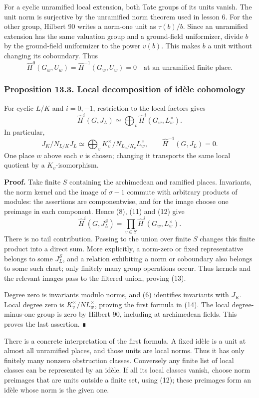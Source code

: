 \documentclass[11pt,a4paper]{article}
\begin{document}
For a cyclic unramified local extension, both Tate groups of its units
vanish. The unit norm is surjective by the unramified norm theorem used
in lesson 6. For the other group, Hilbert 90 writes a norm-one unit as
\(\tau(b)/b\). Since an unramified extension has the same valuation
group and a ground-field uniformizer, divide \(b\) by the ground-field
uniformizer to the power \(v(b)\). This makes \(b\) a unit without
changing its coboundary. Thus \[
\widehat H^0(G_w,U_w)=\widehat H^{-1}(G_w,U_w)=0
\quad\text{at an unramified finite place.}
\tag{12}
\]

\subsubsection{Proposition 13.3. Local decomposition of idèle
cohomology}\label{proposition-13.3.-local-decomposition-of-iduxe8le-cohomology}

For cyclic \(L/K\) and \(i=0,-1\), restriction to the local factors
gives \[
\widehat H^i(G,J_L)
\simeq\bigoplus_v\widehat H^i(G_w,L_w^\times).
\tag{13}
\] In particular, \[
J_K/N_{L/K}J_L
\simeq\bigoplus_v K_v^\times/N_{L_w/K_v}L_w^\times,
\qquad
\widehat H^{-1}(G,J_L)=0.
\tag{14}
\] One place \(w\) above each \(v\) is chosen; changing it transports
the same local quotient by a \(K_v\)-isomorphism.

\textbf{Proof.} Take finite \(S\) containing the archimedean and
ramified places. Invariants, the norm kernel and the image of
\(\sigma-1\) commute with arbitrary products of modules: the assertions
are componentwise, and for the image choose one preimage in each
component. Hence (8), (11) and (12) give \[
\widehat H^i(G,J_L^S)
=\prod_{v\in S}\widehat H^i(G_w,L_w^\times).
\tag{15}
\] There is no tail contribution. Passing to the union over finite \(S\)
changes this finite product into a direct sum. More explicitly, a
norm-zero or fixed representative belongs to some \(J_L^S\), and a
relation exhibiting a norm or coboundary also belongs to some such
chart; only finitely many group operations occur. Thus kernels and the
relevant images pass to the filtered union, proving (13).

Degree zero is invariants modulo norms, and (6) identifies invariants
with \(J_K\). Local degree zero is \(K_v^\times/N L_w^\times\), proving
the first formula in (14). The local degree-minus-one group is zero by
Hilbert 90, including at archimedean fields. This proves the last
assertion. ∎

There is a concrete interpretation of the first formula. A fixed idèle
is a unit at almost all unramified places, and those units are local
norms. Thus it has only finitely many nonzero obstruction classes.
Conversely any finite list of local classes can be represented by an
idèle. If all its local classes vanish, choose norm preimages that are
units outside a finite set, using (12); these preimages form an idèle
whose norm is the given one.
\end{document}
